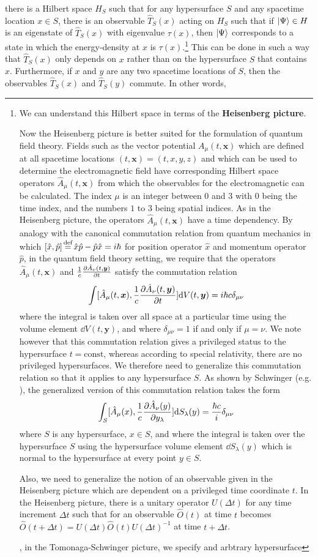 there is a Hilbert space $H_S$ such that for any hypersurface $S$ and any spacetime location $x\in S$, there is an observable $\hat{T}_S(x)$ acting on $H_S$ such that if  $\ket{\Psi}\in H$ is an eigenstate of  $\hat{T}_S(x)$  with eigenvalue $\tau(x)$, then $\ket{\Psi}$ corresponds to a state in which the energy-density at $x$ is $\tau(x)$.\footnote{We can understand this Hilbert space in terms of the \textbf{Heisenberg picture}. 

 Now the Heisenberg picture is better suited for the formulation of quantum field theory. Fields such as the vector potential $A_\mu(t, \bm{x})$ which are defined at all spacetime locations $(t, \bm{x})=(t, x, y, z)$ and which can be used to determine the electromagnetic field have corresponding Hilbert space operators $\hat{A}_\mu(t, \bm{x})$ from which the observables for the electromagnetic can be calculated. The index $\mu$ is an integer between $0$ and $3$ with $0$ being the time index, and the numbers $1$ to $3$ being spatial indices. As in the Heisenberg picture, the operators $\hat{A}_\mu(t, \bm{x})$ have a time dependency. By analogy with the canonical commutation relation from quantum mechanics in which $[\hat{x},\hat{p}]\myeq \hat{x}\hat{p}-\hat{p}\hat{x}=i \hbar$ for position operator $\hat{x}$ and momentum operator $\hat{p}$, in the quantum field theory setting, we require that the operators $\hat{A}_\mu(t, \bm{x})$ and $\frac{1}{c}\pdv{\hat{A}_\nu(t, \bm{y})}{t}$  satisfy the commutation relation  
 $$\int [\hat{A}_\mu(t, \bm{x}),\frac{1}{c}\pdv{\hat{A}_\nu(t, \bm{y})}{t}] \dd V(t, \bm{y}) = i\hbar c \delta_{\mu\nu}$$
 where the integral is taken over all space at a particular time using the volume element $\dd V(t, \bm{y})$, and where $\delta_{\mu\nu}=1$ if and only if $\mu=\nu$. We note however that this commutation relation gives a privileged status to the hypersurface $t=\text{const}$, whereas according to special relativity, there are no privileged hypersurfaces. We therefore need to generalize this commutation relation so that it applies to any hypersurface $S$. As shown by Schwinger (e.g. ), the generalized version of this commutation relation takes the form
  $$\int_S [\hat{A}_\mu(x),\frac{1}{c}\pdv{\hat{A}_\nu(y)}{y_\lambda}] \dd S_\lambda(y)= \frac{\hbar c}{i} \delta_{\mu\nu}$$
where $S$ is any hypersurface, $x\in S$, and where the integral is taken over the hypersurface $S$ using the hypersurface volume element $\dd S_\lambda(y)$ which is normal to the hypersurface at every point $y\in S.$

Also, we need to generalize the notion of an observable given in the Heisenberg picture which are dependent on a privileged time coordinate $t$. In the Heisenberg picture, there is a unitary operator $U(\Delta t)$ for any time increment $\Delta t$ such that for an observable $\hat{O}(t)$ at time $t$ becomes $\hat{O}(t+\Delta t)=U(\Delta t)\hat{O}(t)U(\Delta t)^{-1}$ at time $t+\Delta t$.

, in the  Tomonaga-Schwinger picture, we specify and arbtrary hypersurface
} This can be done in such a way that $\hat{T}_S(x)$ only depends on $x$ rather than on the hypersurface $S$ that contains $x$. Furthermore, if $x$ and $y$ are any two spacetime locations of $S$, then the observables  $\hat{T}_S(x)$ and $\hat{T}_S(y)$ commute. In other words,
